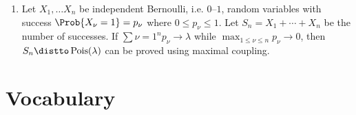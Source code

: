 \documentclass[12pt]{article}
\begin{document}
\begin{enumerate}
    \item
        Let \( X_1, \dots X_n \) be independent Bernoulli, i.e. \( 0 \)--\(
        1 \), random variables with success \( \Prob{X_{\nu} = 1} = p_\nu
        \) where \( 0 \le p_\nu \le 1 \).  Let \( S_n = X_1 + \cdots + X_n
        \) be the number of successes.  If \( \sum{\nu=1}^n p_{\nu} \to
        \lambda \) while \( \max_{1 \le \nu \le n} p_{\nu} \to 0 \),
        then \( S_{n} \distto
        \operatorname{Pois}
        (\lambda) \) can be proved using maximal coupling.
\end{enumerate}

\hr

\section*{Vocabulary}
\end{document}

